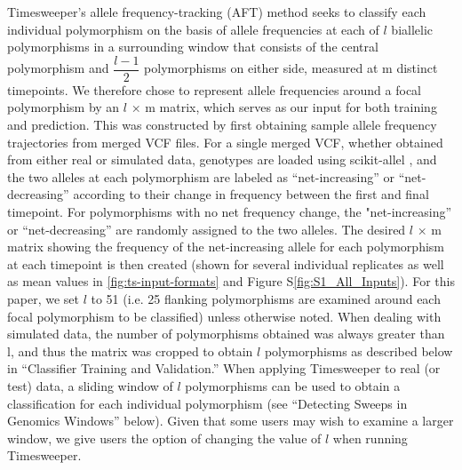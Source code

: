 Timesweeper’s allele frequency-tracking (AFT) method seeks to classify each individual polymorphism on the basis of allele frequencies at each of $l$ biallelic polymorphisms in a surrounding window that consists of the central polymorphism and $\dfrac{l-1}{2}$ polymorphisms on either side, measured at m distinct timepoints. We therefore chose to represent allele frequencies around a focal polymorphism by an $l$ × m matrix, which serves as our input for both training and prediction. This was constructed by first obtaining sample allele frequency trajectories from merged VCF files. For a single merged VCF, whether obtained from either real or simulated data, genotypes are loaded using scikit-allel \cite{milesCgghScikitallelV12021}, and the two alleles at each polymorphism are labeled as “net-increasing” or “net-decreasing” according to their change in frequency between the first and final timepoint. For polymorphisms with no net frequency change, the "net-increasing” or “net-decreasing” are randomly assigned to the two alleles. The desired $l$ × m matrix showing the frequency of the net-increasing allele for each polymorphism at each timepoint is then created (shown for several individual replicates as well as mean values in \ref{fig:ts-input-formats} and Figure S\ref{fig:S1_All_Inputs}). For this paper, we set $l$ to 51 (i.e. 25 flanking polymorphisms are examined around each focal polymorphism to be classified) unless otherwise noted. When dealing with simulated data, the number of polymorphisms obtained was always greater than l, and thus the matrix was cropped to obtain $l$ polymorphisms as described below in “Classifier Training and Validation.” When applying Timesweeper to real (or test) data, a sliding window of $l$ polymorphisms can be used to obtain a classification for each individual polymorphism (see “Detecting Sweeps in Genomics Windows” below). Given that some users may wish to examine a larger window, we give users the option of changing the value of $l$ when running Timesweeper. \\

